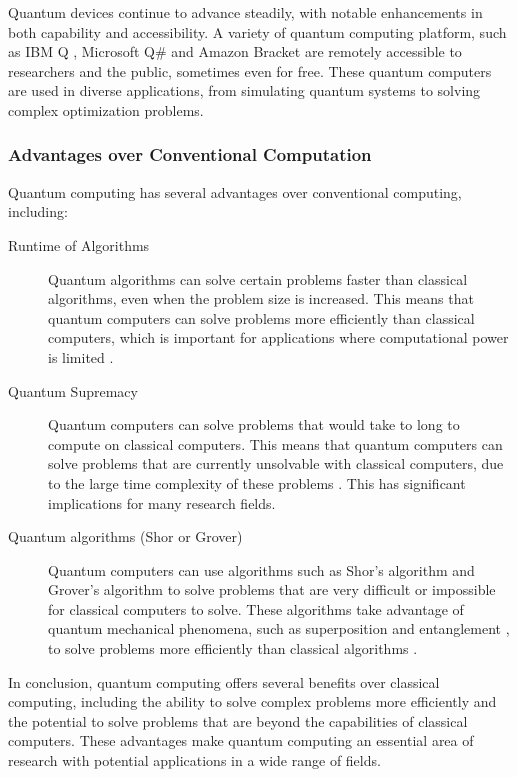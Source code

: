 \documentclass[11pt]{article}
\theoremstyle{definition}
\theoremstyle{definition}
\begin{document}
Quantum devices continue to advance steadily, with notable enhancements in
both capability and accessibility.
A variety of quantum computing platform, such as IBM Q \cite{cross_ibmq_2018}, Microsoft Q\# \cite{hooyberghs_qsharp_2022} and Amazon Bracket \cite{gonzalez_cloud_2021}
are remotely accessible to researchers and the public, sometimes even for free.
These quantum computers are used in diverse applications, from simulating
quantum systems to solving complex optimization problems.

\subsubsection{Advantages over Conventional Computation}
\label{sec:orgd20e6ae}
Quantum computing has several advantages over conventional computing, including:
\begin{description}
\item[{Runtime of Algorithms}] Quantum algorithms can solve certain problems faster
than classical algorithms, even when the problem size is increased. This
means that quantum computers can solve problems more efficiently than
classical computers, which is important for applications where computational
power is limited \cite{montanaro_quantum_2016}.
\item[{Quantum Supremacy}] Quantum computers can solve problems that would
take to long to compute on classical computers. This means that quantum computers can
solve problems that are currently unsolvable with classical computers, due to the
large time complexity of these problems \cite{preskill_quantum_2012}. This has significant implications for
many research fields.
\item[{Quantum algorithms (Shor or Grover)}] Quantum computers can use algorithms
such as Shor's algorithm \cite{shor_poly_1997} and Grover's algorithm
\cite{grover_fast_1996} to solve problems that are very difficult or
impossible for classical computers to solve. These algorithms take advantage
of quantum mechanical phenomena, such as superposition and entanglement
\cite{jozsa_entanglement_1997}, to solve problems more efficiently than
classical algorithms \cite{nielsen_quantum_2010}.
\end{description}

In conclusion, quantum computing offers several benefits over classical
computing, including the ability to solve complex problems more efficiently
and the potential to solve problems that are beyond the capabilities of
classical computers. These advantages make quantum computing an essential
area of research with potential applications in a wide range of fields.
\end{document}
